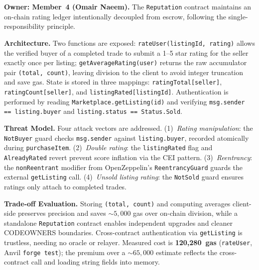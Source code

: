 \textbf{Owner: Member~4 (Omair Naeem).} The \texttt{Reputation} contract maintains an on-chain rating ledger intentionally decoupled from escrow, following the single-responsibility principle.

\textbf{Architecture.} Two functions are exposed: \texttt{rateUser(listingId, rating)} allows the verified buyer of a completed trade to submit a 1--5 star rating for the seller exactly once per listing; \texttt{getAverageRating(user)} returns the raw accumulator pair \texttt{(total,~count)}, leaving division to the client to avoid integer truncation and save gas. State is stored in three mappings: \texttt{ratingTotal[seller]}, \texttt{ratingCount[seller]}, and \texttt{listingRated[listingId]}. Authentication is performed by reading \texttt{Marketplace.getListing(id)} and verifying \texttt{msg.sender == listing.buyer} and \texttt{listing.status == Status.Sold}.

\textbf{Threat Model.} Four attack vectors are addressed. (1)~\emph{Rating manipulation}: the \texttt{NotBuyer} guard checks \texttt{msg.sender} against \texttt{listing.buyer}, recorded atomically during \texttt{purchaseItem}. (2)~\emph{Double rating}: the \texttt{listingRated} flag and \texttt{AlreadyRated} revert prevent score inflation via the CEI pattern. (3)~\emph{Reentrancy}: the \texttt{nonReentrant} modifier from OpenZeppelin's \texttt{ReentrancyGuard} guards the external \texttt{getListing} call. (4)~\emph{Unsold listing rating}: the \texttt{NotSold} guard ensures ratings only attach to completed trades.

\textbf{Trade-off Evaluation.} Storing \texttt{(total,~count)} and computing averages client-side preserves precision and saves ${\sim}5{,}000$ gas over on-chain division, while a standalone \texttt{Reputation} contract enables independent upgrades and cleaner CODEOWNERS boundaries. Cross-contract authentication via \texttt{getListing} is trustless, needing no oracle or relayer. Measured cost is \textbf{120,280~gas} (\texttt{rateUser}, Anvil \texttt{forge test}); the premium over a ${\sim}65{,}000$ estimate reflects the cross-contract call and loading string fields into memory.